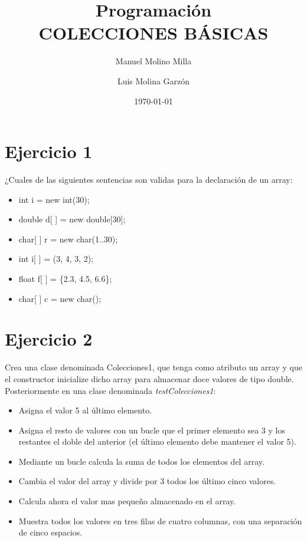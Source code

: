 \documentclass[4paper]{article}
\author{Manuel Molino Milla \and Luis Molina Garzón}
\title{\textbf{Programación}
\\COLECCIONES BÁSICAS}
\date{\today}
\begin{document}
\maketitle


\section*{Ejercicio 1}
¿Cuales de las siguientes sentencias son validas para la declaración de un array:
\begin{itemize}
\item int i = new int(30);
\item double d[ ] = new double[30];
\item char[ ] r = new char(1..30);
\item int i[ ] = (3, 4, 3, 2);
\item float f[ ] = \{2.3, 4.5, 6.6\};
\item char[ ] c = new char();
\end{itemize}

\section*{Ejercicio 2}
Crea una clase denominada Colecciones1, que tenga como atributo un array y que el constructor inicialize dicho array para almacenar doce valores de tipo double. Posteriormente en una clase denominada \emph{testColecciones1}:
\begin{itemize}
\item Asigna el valor 5 al último elemento.
\item Asigna el resto de valores con un bucle que el primer elemento sea 3 y los restantes el doble del anterior (el último elemento debe mantener el valor 5).
\item Mediante un bucle calcula la suma de todos los elementos del array.
\item Cambia el valor del array y divide por 3 todos los último cinco valores.
\item Calcula ahora el valor mas pequeño almacenado en el array.
\item Muestra todos los valores en tres filas de cuatro columnas, con una separación de cinco espacios.
\end{itemize}
\end{document}
